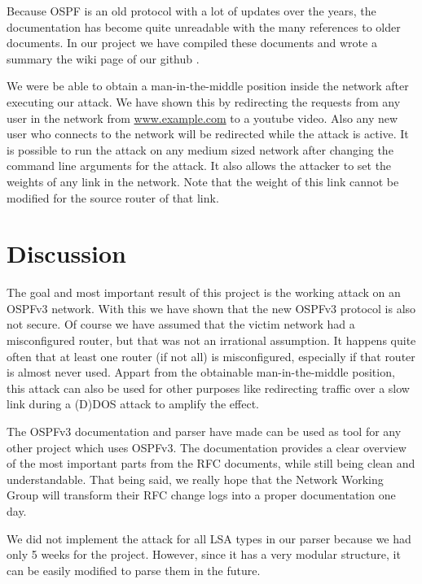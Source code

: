\documentclass[11pt,a4paper,oneside]{article}
\newcommand{\lsection}[2]{\section{#1}\label{sec:#2}}
\begin{document}
		Because OSPF is an old protocol with a lot of updates over the years, the documentation has become quite unreadable with the many references to older documents. In our project we have compiled these documents and wrote a summary the wiki page of our github \cite{wiki}.
		
		We were be able to obtain a man-in-the-middle position inside the network after executing our attack. We have shown this by redirecting the requests from any user in the network from \url{www.example.com} to a youtube video. Also any new user who connects to the network will be redirected while the attack is active.
		It is possible to run the attack on any medium sized network after changing the command line arguments for the attack. It also allows the attacker to set the weights of any link in the network. Note that the weight of this link cannot be modified for the source router of that link.
    		
    		
    \lsection{Discussion}{discussion}
    		The goal and most important result of this project is the working attack on an OSPFv3 network. With this we have shown that the new OSPFv3 protocol is also not secure. Of course we have assumed that the victim network had a misconfigured router, but that was not an irrational assumption. It happens quite often that at least one router (if not all) is misconfigured, especially if that router is almost never used.
    		Appart from the obtainable man-in-the-middle position, this attack can also be used for other purposes like redirecting traffic over a slow link during a (D)DOS attack to amplify the effect.
    		
		The OSPFv3 documentation and parser have made can be used as tool for any other project which uses OSPFv3.
		The documentation provides a clear overview of the most important parts from the RFC documents, while still being clean and understandable. That being said, we really hope that the Network Working Group will transform their RFC change logs into a proper documentation one day.
		
		We did not implement the attack for all LSA types in our parser because we had only 5 weeks for the project. However, since it has a very modular structure, it can be easily modified to parse them in the future.
		
\end{document}
